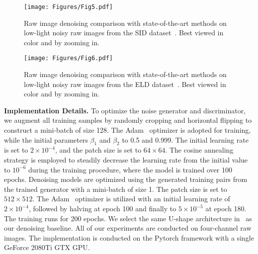 \documentclass[10pt,twocolumn,letterpaper]{article}
\begin{document}
\begin{figure*}
\begin{center}
\texttt{[image: Figures/Fig5.pdf]}
\caption{Raw image denoising comparison with state-of-the-art methods on low-light noisy raw images from the SID dataset~\cite{chen2018learning}. Best viewed in color and by zooming in.}
\label{fig:SID}
\end{center}
\vspace{-3ex}
\end{figure*}

\begin{figure*}
\begin{center}
\texttt{[image: Figures/Fig6.pdf]}
\caption{Raw image denoising comparison with state-of-the-art methods on low-light noisy raw images from the ELD dataset~\cite{wei2020physics}. Best viewed in color
and by zooming in.}
\label{fig:ELD}
\end{center}
\vspace{-4ex}
\end{figure*}

\textbf{Implementation Details.} To optimize the noise generator and discriminator, we augment all training samples by randomly cropping and horizontal flipping to construct a mini-batch of size 128. The Adam~\cite{kingma2014adam} optimizer is adopted for training, while the initial parameters $\beta_{1}$ and $\beta_{2}$ to 0.5 and 0.999. The initial learning rate is set to $2\times10^{-4}$, and the patch size is set to $64\times64$. The cosine annealing strategy is employed to steadily decrease the learning rate from the initial value to $10^{-6}$ during the training procedure, where the model is trained over 100 epochs. Denoising models are optimized using the generated training pairs from the trained generator with a mini-batch of size 1. The patch size is set to $512\times512$. The Adam~\cite{kingma2014adam} optimizer is utilized with an initial learning rate of $2\times10^{-4}$, followed by halving at epoch 100 and finally to $5\times10^{-5}$ at epoch 180. The training runs for 200 epochs. We select the same U-shape architecture in~\cite{chen2018learning} as our denoising baseline. All of our experiments are conducted on four-channel raw images. The implementation is conducted on the Pytorch framework with a single GeForce 2080Ti GTX GPU.

\vspace{-0.5em}
\end{document}
